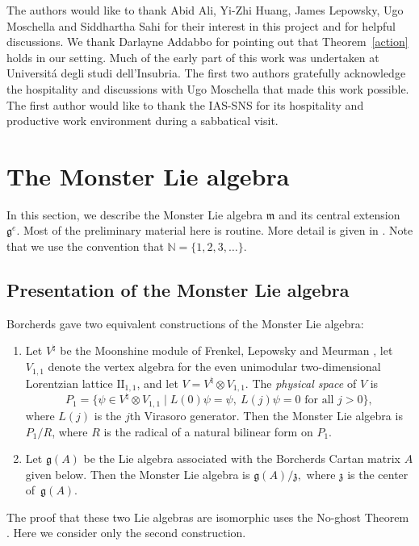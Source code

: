 \documentclass[11pt,letterpaper]{amsart}
\numberwithin{thecounter}{section}
\theoremstyle{definition}
\newcommand{\N}{{\mathbb N}}
\begin{document}
The authors would like to thank Abid Ali,  Yi-Zhi Huang, James Lepowsky, Ugo Moschella and Siddhartha Sahi for their interest in this project and for helpful discussions. We thank Darlayne Addabbo for pointing out that Theorem~\ref{action} holds in our setting.
Much of the early part of this work was undertaken at Universit\'a degli studi dell'Insubria. The first two authors gratefully acknowledge the hospitality and discussions with Ugo Moschella that made this work possible. The first author would like to thank the IAS-SNS for its hospitality and productive work environment during a sabbatical visit.






\section{The Monster Lie algebra}\label{S-borcherds}
In this section, we describe the Monster Lie algebra $\mathfrak{m}$ and its central extension $\mathfrak{g}^e$. Most of the preliminary material here is routine. More detail is given in \cite{CarXiv}.
Note that we use the convention that $\N=\{1,2,3,\dots\}$.

\subsection{Presentation of the Monster Lie algebra}\label{SS-pres}
Borcherds \cite{BoInvent}
 gave two equivalent constructions of the Monster Lie algebra:
\begin{enumerate} 
\item  Let $V^\natural$ be the Moonshine module of  Frenkel, Lepowsky and Meurman \cite{FLM}, let $V_{{1,1}}$ denote the vertex  algebra  for the even unimodular two-dimensional Lorentzian lattice  $\textrm{II}_{1,1}$, and let $V=V^\natural\otimes V_{{1,1}}$. The {\emph{physical space}} of $V$ is
$$P_1=\{\psi\in V^\natural\otimes V_{1,1}\mid L(0)\psi=\psi,\ L(j)\psi=0 \text{ for all $j> 0$}\},$$
where $L(j)$ is  the $j$th Virasoro generator.
Then the Monster Lie algebra is $P_1/R$, where  $R$ is the radical of a natural bilinear form on $P_1$. 

\item Let $\mathfrak g(A)$ be the Lie algebra associated with  the Borcherds Cartan matrix $A$ given below. Then the Monster Lie algebra is  $\mathfrak{g}(A)/\mathfrak{z},$ where $\mathfrak{z}$ is the center of~$\mathfrak g(A)$. 
\end{enumerate}
The proof  that these two Lie algebras are isomorphic uses %
the No-ghost Theorem \cite{GT}. Here we consider only the second construction.
\end{document}
